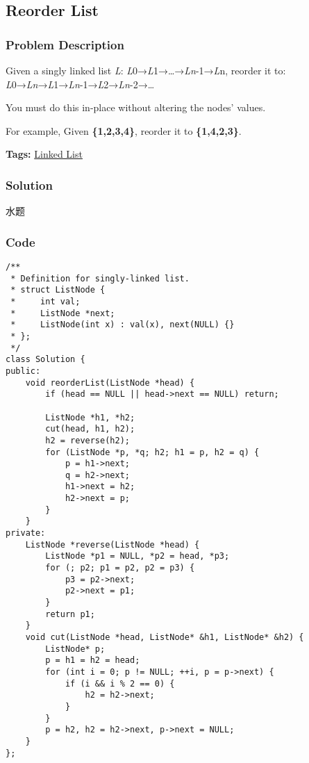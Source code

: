 \documentclass{article}
\begin{document}
\begin{CJK*}{UTF8}{gkai}
\subsection{ Reorder List }
\label{ Reorder List }

\subsubsection*{Problem Description}
Given a singly linked list \emph{L}: \emph{L}0→\emph{L}1→…→\emph{L}\emph{n}-1→\emph{L}n,
reorder it to: \emph{L}0→\emph{L}\emph{n}→\emph{L}1→\emph{L}\emph{n}-1→\emph{L}2→\emph{L}\emph{n}-2→…

You must do this in-place without altering the nodes' values.

For example,
Given \textbf{\{1,2,3,4\}}, reorder it to \textbf{\{1,4,2,3\}}.


\textbf{Tags: }
\hyperref[ Linked List ]{ Linked List }



\subsubsection*{Solution}
水题

\subsubsection*{Code}
\begin{lstlisting}
/**
 * Definition for singly-linked list.
 * struct ListNode {
 *     int val;
 *     ListNode *next;
 *     ListNode(int x) : val(x), next(NULL) {}
 * };
 */
class Solution {
public:
    void reorderList(ListNode *head) {
        if (head == NULL || head->next == NULL) return;
        
        ListNode *h1, *h2;
        cut(head, h1, h2);
        h2 = reverse(h2);
        for (ListNode *p, *q; h2; h1 = p, h2 = q) {
            p = h1->next;
            q = h2->next;
            h1->next = h2;
            h2->next = p;
        }
    }
private:
    ListNode *reverse(ListNode *head) {
        ListNode *p1 = NULL, *p2 = head, *p3;
        for (; p2; p1 = p2, p2 = p3) {
            p3 = p2->next;
            p2->next = p1;
        }
        return p1;
    }
    void cut(ListNode *head, ListNode* &h1, ListNode* &h2) {
        ListNode* p;
        p = h1 = h2 = head;
        for (int i = 0; p != NULL; ++i, p = p->next) {
            if (i && i % 2 == 0) {
                h2 = h2->next;
            }
        }
        p = h2, h2 = h2->next, p->next = NULL;
    }
}; 
\end{lstlisting}



\end{CJK*}
\end{document}
